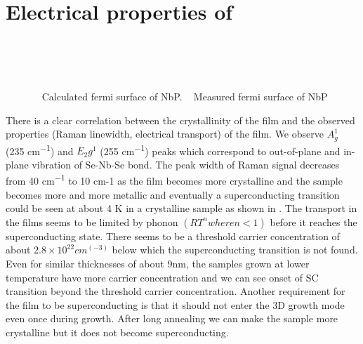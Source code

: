 
\section{Electrical properties of \nbse}

\begin{figure}
    \centering
    \\
    \\
    \\
    \caption{
        \sfA~ Calculated fermi surface of NbP.
        \sfB~ Measured fermi surface of NbP
    }
\end{figure}
There is a clear correlation between the crystallinity of the film and the observed 
properties (Raman linewidth, electrical transport) of the film. We observe 
$A_g^1$ (235 \si{cm^{-1}}) and $E_2g^1$ (255 \si{cm^{-1}}) peaks which correspond to out-of-plane 
and in-plane vibration of Se-Nb-Se bond. The peak width of Raman signal decreases from 
40 \si{cm^{-1}} to 10 cm-1 as the film becomes more crystalline and the sample becomes more 
and more metallic and eventually a superconducting transition could be seen at about 4 \si{K} 
in a crystalline sample as shown in . 
The transport in the films seems to be limited by phonon $(R T^n where n<1)$ before 
it reaches the superconducting state. There seems to be a threshold carrier concentration 
of about $2.8×10^22  cm^(-3)$ below which the superconducting transition is not found. 
Even for similar thicknesses of about 9nm, the samples grown at lower temperature have more 
carrier concentration and we can see onset of SC transition beyond the threshold carrier concentration. 
Another requirement for the film to be superconducting is that it should not enter the 3D growth mode 
even once during growth. After long annealing we can make the sample more crystalline but it does not 
become superconducting.


